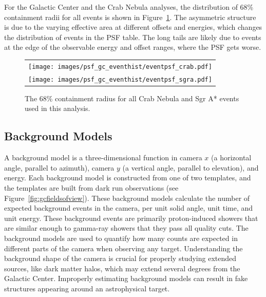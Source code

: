     For the Galactic Center and the Crab Nebula analyses, the distribution of 68\% containment radii for all events is shown in Figure~\ref{fig:gc_psf_hist}.
    The asymmetric structure is due to the varying effective area at different offsets and energies, which changes the distribution of events in the PSF table.
    The long tails are likely due to events at the edge of the observable energy and offset ranges, where the PSF gets worse.

    \begin{figure}[!hb]
      \centering
      \begin{tabular}{c}
        \texttt{[image: images/psf\_gc\_eventhist/eventpsf\_crab.pdf]} \\
        \texttt{[image: images/psf\_gc\_eventhist/eventpsf\_sgra.pdf]}
      \end{tabular}
      \caption[Crab and Galactic Center Event PSFs]{
        The 68\% containment radius for all Crab Nebula and Sgr A* events used in this analysis.
      }
      \label{fig:gc_psf_hist}
    \end{figure}
  
  \FloatBarrier
  
  \subsection{Background Models}\label{background_production}
  
    A background model is a three-dimensional function in camera $x$ (a horizontal angle, parallel to azimuth), camera $y$ (a vertical angle, parallel to elevation), and energy.
    Each background model is constructed from one of two templates, and the templates are built from dark run observations (see Figure~\ref{fig:gcfieldsofview}).
    These background models calculate the number of expected background events in the camera, per unit solid angle, unit time, and unit energy.
    These background events are primarily proton-induced showers that are similar enough to gamma-ray showers that they pass all quality cuts.
    The background models are used to quantify how many counts are expected in different parts of the camera when observing any target.
    Understanding the background shape of the camera is crucial for properly studying extended sources, like dark matter halos, which may extend several degrees from the Galactic Center.
    Improperly estimating background models can result in fake structures appearing around an astrophysical target.
    
